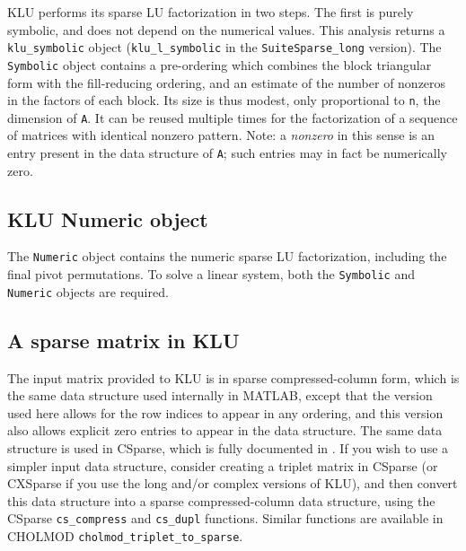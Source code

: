 \documentclass[11pt]{article}
\begin{document}
KLU performs its sparse LU factorization in two steps.  The first is purely
symbolic, and does not depend on the numerical values.  This analysis returns a
{\tt klu\_symbolic} object ({\tt klu\_l\_symbolic} in the {\tt SuiteSparse\_long}
version).  The {\tt Symbolic} object contains a pre-ordering which combines the
block triangular form with the fill-reducing ordering, and an estimate of the
number of nonzeros in the factors of each block.  Its size is thus modest, only
proportional to {\tt n}, the dimension of {\tt A}.  It can be reused multiple
times for the factorization of a sequence of matrices with identical nonzero
pattern.  Note: a {\em nonzero} in this sense is an entry present in the data
structure of {\tt A}; such entries may in fact be numerically zero.

\subsection{KLU Numeric object}

The {\tt Numeric} object contains the numeric sparse LU factorization, including
the final pivot permutations.  To solve a linear system, both the {\tt Symbolic}
and {\tt Numeric} objects are required.

\subsection{A sparse matrix in KLU}


The input matrix provided to KLU is in sparse compressed-column form, which is
the same data structure used internally in MATLAB, except that the version used
here allows for the row indices to appear in any ordering, and this version
also allows explicit zero entries to appear in the data structure.  The same
data structure is used in CSparse, which is fully documented in
\cite{Davis06book}.  If you wish to use a simpler input data structure,
consider creating a triplet matrix in CSparse (or CXSparse if you use the long
and/or complex versions of KLU), and then convert this data structure into a
sparse compressed-column data structure, using the CSparse {\tt cs\_compress}
and {\tt cs\_dupl} functions.  Similar functions are available in CHOLMOD
{\tt cholmod\_triplet\_to\_sparse}.
\end{document}

